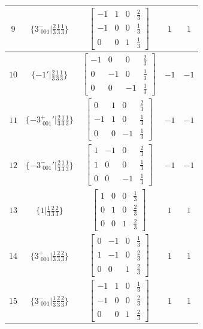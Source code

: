 \documentclass[fleqn,8pt]{jsarticle}
\begin{document}
\begin{longtable}{ccccc}
$ 9 $ & $ \{3^{-}_{\,\,001}|\frac{2}{3} \frac{1}{3} \frac{1}{3}\} $ & $ \begin{bmatrix} -1 & 1 & 0 & \frac{2}{3} \\ -1 & 0 & 0 & \frac{1}{3} \\ 0 & 0 & 1 & \frac{1}{3} \end{bmatrix} $ & $ 1 $ & $ 1 $ \\ \hline
$ 10 $ & $ \{-1{}'|\frac{2}{3} \frac{1}{3} \frac{1}{3}\} $ & $ \begin{bmatrix} -1 & 0 & 0 & \frac{2}{3} \\ 0 & -1 & 0 & \frac{1}{3} \\ 0 & 0 & -1 & \frac{1}{3} \end{bmatrix} $ & $ -1 $ & $ -1 $ \\ \hline
$ 11 $ & $ \{-3^{+}_{\,\,001}{}'|\frac{2}{3} \frac{1}{3} \frac{1}{3}\} $ & $ \begin{bmatrix} 0 & 1 & 0 & \frac{2}{3} \\ -1 & 1 & 0 & \frac{1}{3} \\ 0 & 0 & -1 & \frac{1}{3} \end{bmatrix} $ & $ -1 $ & $ -1 $ \\ \hline
$ 12 $ & $ \{-3^{-}_{\,\,001}{}'|\frac{2}{3} \frac{1}{3} \frac{1}{3}\} $ & $ \begin{bmatrix} 1 & -1 & 0 & \frac{2}{3} \\ 1 & 0 & 0 & \frac{1}{3} \\ 0 & 0 & -1 & \frac{1}{3} \end{bmatrix} $ & $ -1 $ & $ -1 $ \\ \hline
$ 13 $ & $ \{1|\frac{1}{3} \frac{2}{3} \frac{2}{3}\} $ & $ \begin{bmatrix} 1 & 0 & 0 & \frac{1}{3} \\ 0 & 1 & 0 & \frac{2}{3} \\ 0 & 0 & 1 & \frac{2}{3} \end{bmatrix} $ & $ 1 $ & $ 1 $ \\ \hline
$ 14 $ & $ \{3^{+}_{\,\,001}|\frac{1}{3} \frac{2}{3} \frac{2}{3}\} $ & $ \begin{bmatrix} 0 & -1 & 0 & \frac{1}{3} \\ 1 & -1 & 0 & \frac{2}{3} \\ 0 & 0 & 1 & \frac{2}{3} \end{bmatrix} $ & $ 1 $ & $ 1 $ \\ \hline
$ 15 $ & $ \{3^{-}_{\,\,001}|\frac{1}{3} \frac{2}{3} \frac{2}{3}\} $ & $ \begin{bmatrix} -1 & 1 & 0 & \frac{1}{3} \\ -1 & 0 & 0 & \frac{2}{3} \\ 0 & 0 & 1 & \frac{2}{3} \end{bmatrix} $ & $ 1 $ & $ 1 $ \\ \hline

\end{longtable}
\end{document}
